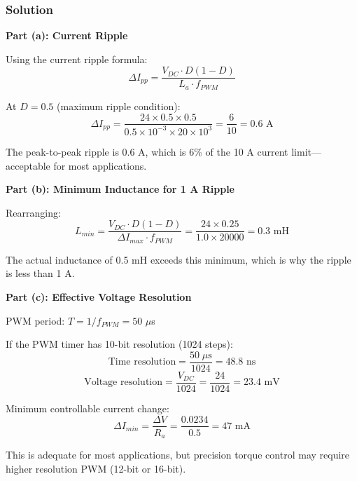 \subsubsection{Solution}

\textbf{Part (a): Current Ripple}

Using the current ripple formula:
\begin{equation}
    \Delta I_{pp} = \frac{V_{DC} \cdot D(1-D)}{L_a \cdot f_{PWM}}
\end{equation}

At $D = 0.5$ (maximum ripple condition):
\begin{equation}
    \Delta I_{pp} = \frac{24 \times 0.5 \times 0.5}{0.5 \times 10^{-3} \times 20 \times 10^3} = \frac{6}{10} = 0.6 \text{ A}
\end{equation}

The peak-to-peak ripple is 0.6 A, which is 6\% of the 10 A current limit---acceptable for most applications.

\textbf{Part (b): Minimum Inductance for 1 A Ripple}

Rearranging:
\begin{equation}
    L_{min} = \frac{V_{DC} \cdot D(1-D)}{\Delta I_{max} \cdot f_{PWM}} = \frac{24 \times 0.25}{1.0 \times 20000} = 0.3 \text{ mH}
\end{equation}

The actual inductance of 0.5 mH exceeds this minimum, which is why the ripple is less than 1 A.

\textbf{Part (c): Effective Voltage Resolution}

PWM period: $T = 1/f_{PWM} = 50$ $\mu$s

If the PWM timer has 10-bit resolution (1024 steps):
\begin{equation}
    \text{Time resolution} = \frac{50 \; \mu\text{s}}{1024} = 48.8 \text{ ns}
\end{equation}
\begin{equation}
    \text{Voltage resolution} = \frac{V_{DC}}{1024} = \frac{24}{1024} = 23.4 \text{ mV}
\end{equation}

Minimum controllable current change:
\begin{equation}
    \Delta I_{min} = \frac{\Delta V}{R_a} = \frac{0.0234}{0.5} = 47 \text{ mA}
\end{equation}

This is adequate for most applications, but precision torque control may require higher resolution PWM (12-bit or 16-bit).

